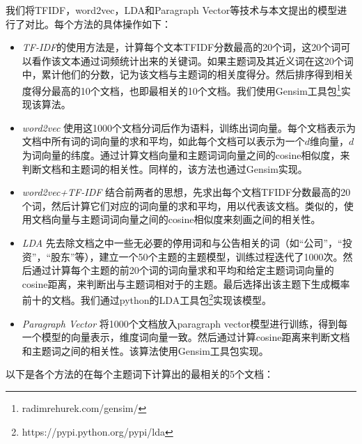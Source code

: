 \documentclass[UTF8,11pt,a4paper,nofonts]{ctexart}
\begin{document}
我们将TFIDF，word2vec，LDA和Paragraph Vector等技术与本文提出的模型进行了对比。每个方法的具体操作如下：
\begin{itemize}
\item \emph{TF-IDF}的使用方法是，计算每个文本TFIDF分数最高的20个词，这20个词可以看作该文本通过词频统计出来的关键词。如果主题词及其近义词在这20个词中，累计他们的分数，记为该文档与主题词的相关度得分。然后排序得到相关度得分最高的10个文档，也即最相关的10个文档。我们使用Gensim工具包\footnote{radimrehurek.com/gensim/}实现该算法。
\item \emph{word2vec} 使用这1000个文档分词后作为语料，训练出词向量。每个文档表示为文档中所有词的词向量的求和平均，如此每个文档可以表示为一个$d$维向量，$d$为词向量的纬度。通过计算文档向量和主题词词向量之间的cosine相似度，来判断文档和主题词的相关性。同样的，该方法也通过Gensim实现。
\item \emph{word2vec+TF-IDF} 结合前两者的思想，先求出每个文档TFIDF分数最高的20个词，然后计算它们对应的词向量的求和平均，用以代表该文档。类似的，使用文档向量与主题词词向量之间的cosine相似度来刻画之间的相关性。
\item \emph{LDA} 先去除文档之中一些无必要的停用词和与公告相关的词（如“公司”，“投资”，“股东”等），建立一个50个主题的主题模型，训练过程迭代了1000次。然后通过计算每个主题的前20个词的词向量求和平均和给定主题词词向量的cosine距离，来判断出与主题词相对于的主题。最后选择出该主题下生成概率前十的文档。我们通过python的LDA工具包\footnote{https://pypi.python.org/pypi/lda}实现该模型。
\item \emph{Paragraph Vector} 将1000个文档放入paragraph vector模型进行训练，得到每一个模型的向量表示，维度词向量一致。然后通过计算cosine距离来判断文档和主题词之间的相关性。该算法使用Gensim工具包实现。
\end{itemize}

以下是各个方法的在每个主题词下计算出的最相关的5个文档：
\end{document}
